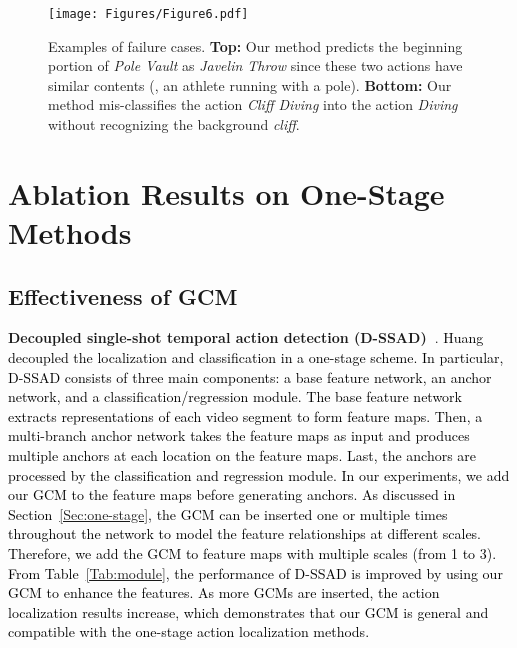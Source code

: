 \documentclass[10pt,journal,compsoc]{IEEEtran}
\def\hao{\textcolor{black}}
\begin{document}
	\begin{figure*}[!t]
	\centering
	\texttt{[image: Figures/Figure6.pdf]}
    \caption{Examples of failure cases. \textbf{Top:} Our method predicts the beginning portion of \emph{Pole Vault} as \emph{Javelin Throw} since these two actions have similar contents (\ie, an athlete running with a pole).
    \textbf{Bottom:} Our method mis-classifies the action \emph{Cliff Diving} into the action \emph{Diving} without recognizing the background \emph{cliff}.
    }
	\label{Fig:failure}
    \end{figure*}
	
	

	
	\section{Ablation Results on One-Stage Methods}
	

	
	\subsection{Effectiveness of GCM}
	\noindent \textbf{Decoupled single-shot temporal action detection (D-SSAD)~\cite{huang2019decoupling}}. \hao{Huang \etal decoupled the localization and classification in a one-stage scheme.
		In particular, D-SSAD consists of three main components: a base feature network, an anchor network, and a classification/regression module. The base feature network extracts representations of each video segment to form feature maps. Then, a multi-branch anchor network takes the feature maps as input and produces multiple anchors at each location on the feature maps. Last, the anchors are processed by the classification and regression module. In our experiments, we add our GCM to the feature maps before generating anchors. As discussed in Section~\ref{Sec:one-stage}, the GCM can be inserted one or multiple times throughout the network to model the feature relationships at different scales. Therefore, we add the GCM to feature maps with multiple scales (from 1 to 3). From Table~\ref{Tab:module}, the performance of D-SSAD is improved by using our GCM to enhance the features. As more GCMs are inserted, the action localization results increase, which demonstrates that our GCM is general and compatible with the one-stage action localization methods. }
	
\end{document}
